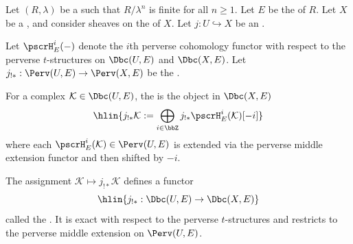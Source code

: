 \begin{definition} \label{definition:middle_extension_functor_for_constructible_complexes_with_rational_coefficients_on_open_immersion}
Let $(R, \lambda)$ be a   such that $R/\lambda^n$ is finite for all $n \geq 1$. Let $E$ be the  of $R$. Let $X$ be a , and consider sheaves on the  of $X$. Let $j: U \hookrightarrow X$ be an .

Let $\pscrH^i_E(-)$ denote the $i$th perverse cohomology functor with respect to the perverse $t$-structures on $\Dbc(U, E)$ and $\Dbc(X, E)$. Let $j_{!*}: \Perv(U, E) \to \Perv(X, E)$ be the .

For a complex $\mathcal{K} \in \Dbc(U, E)$, the  is the object in $\Dbc(X, E)$
$$\hlin{j_{!*} \mathcal{K} := \bigoplus_{i \in \bbZ} j_{!*} \pscrH^i_E(\mathcal{K})[-i]}$$
where each $\pscrH^i_E(\mathcal{K}) \in \Perv(U, E)$ is extended via the perverse middle extension functor and then shifted by $-i$.

The assignment $\mathcal{K} \mapsto j_{!*}\mathcal{K}$ defines a functor
$$\hlin{j_{!*}: \Dbc(U, E) \to \Dbc(X, E)}$$
called the . It is exact with respect to the perverse $t$-structures and restricts to the perverse middle extension on $\Perv(U, E)$.
\end{definition}
